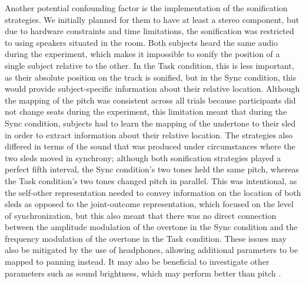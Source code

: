 \documentclass[10pt,a4paper,onecolumn]{article}
\begin{document}
Another potential confounding factor is the implementation of the sonification strategies. We initially planned for them to have at least a stereo component, but due to hardware constraints and time limitations, the sonification was restricted to using speakers situated in the room. Both subjects heard the same audio during the experiment, which makes it impossible to sonify the position of a single subject relative to the other. In the Task condition, this is less important, as their absolute position on the track is sonified, but in the Sync condition, this would provide subject-specific information about their relative location. Although the mapping of the pitch was consistent across all trials because participants did not change seats during the experiment, this limitation meant that during the Sync condition, subjects had to learn the mapping of the undertone to their sled in order to extract information about their relative location. The strategies also differed in terms of the sound that was produced under circumstances where the two sleds moved in synchrony; although both sonification strategies played a perfect fifth interval, the Sync condition's two tones held the same pitch, whereas the Task condition's two tones changed pitch in parallel. This was intentional, as the self-other representation needed to convey information on the location of both sleds as opposed to the joint-outcome representation, which focused on the level of synchronization, but this also meant that there was no direct connection between the amplitude modulation of the overtone in the Sync condition and the frequency modulation of the overtone in the Task condition. These issues may also be mitigated by the use of headphones, allowing additional parameters to be mapped to panning instead. It may also be beneficial to investigate other parameters such as sound brightness, which may perform better than pitch \autocite{mcdermottMusicalIntervalsRelative2010}.
\end{document}
